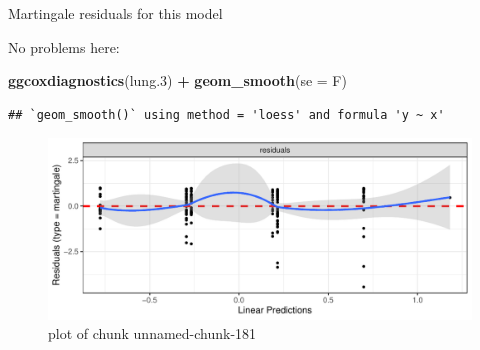 \documentclass[ignorenonframetext,]{beamer}
\newenvironment{Shaded}{\begin{snugshade}}{\end{snugshade}}
\newcommand{\DataTypeTok}[1]{\textcolor[rgb]{0.13,0.29,0.53}{#1}}
\newcommand{\FloatTok}[1]{\textcolor[rgb]{0.00,0.00,0.81}{#1}}
\newcommand{\KeywordTok}[1]{\textcolor[rgb]{0.13,0.29,0.53}{\textbf{#1}}}
\newcommand{\NormalTok}[1]{#1}
\newcommand{\OperatorTok}[1]{\textcolor[rgb]{0.81,0.36,0.00}{\textbf{#1}}}
\newcommand{\StringTok}[1]{\textcolor[rgb]{0.31,0.60,0.02}{#1}}
\begin{document}
\begin{frame}[fragile]{Martingale residuals for this model}
\protect\hypertarget{martingale-residuals-for-this-model}{}

No problems here:

\begin{Shaded}
\begin{Highlighting}[]
\KeywordTok{ggcoxdiagnostics}\NormalTok{(lung}\FloatTok{.3}\NormalTok{) }\OperatorTok{+}\StringTok{ }\KeywordTok{geom_smooth}\NormalTok{(}\DataTypeTok{se =}\NormalTok{ F)}
\end{Highlighting}
\end{Shaded}

\begin{verbatim}
## `geom_smooth()` using method = 'loess' and formula 'y ~ x'
\end{verbatim}

\begin{figure}
\centering
\includegraphics{figure/unnamed-chunk-181-1.pdf}
\caption{plot of chunk unnamed-chunk-181}
\end{figure}

\end{frame}
\end{document}

